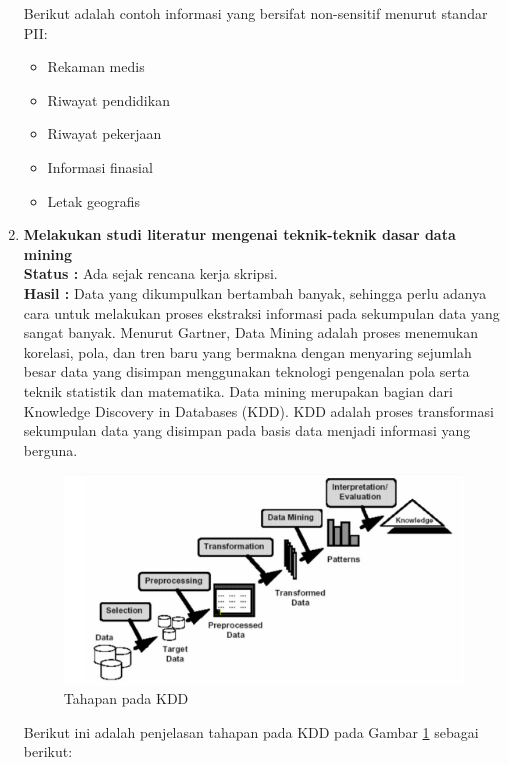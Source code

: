 \documentclass[a4paper,twoside]{article}
\begin{document}
\begin{enumerate}
\noindent Berikut adalah contoh informasi yang bersifat non-sensitif menurut standar PII:
\begin{itemize}
\item Rekaman medis
\item Riwayat pendidikan
\item Riwayat pekerjaan 
\item Informasi finasial
\item Letak geografis
\end{itemize}

		\item \textbf{Melakukan studi literatur mengenai teknik-teknik dasar data mining}\\
		{\bf Status :} Ada sejak rencana kerja skripsi.\\
		{\bf Hasil :} Data yang dikumpulkan bertambah banyak, sehingga perlu adanya cara untuk melakukan proses ekstraksi informasi pada sekumpulan data yang sangat banyak. Menurut Gartner, Data Mining adalah proses menemukan korelasi, pola, dan tren baru yang bermakna dengan menyaring sejumlah besar data yang disimpan menggunakan teknologi pengenalan pola serta teknik statistik dan matematika. Data mining merupakan bagian dari Knowledge Discovery in Databases (KDD). KDD adalah proses transformasi sekumpulan data yang disimpan pada basis data menjadi informasi yang berguna.\\

\begin{figure}[H]
	\centering
	\includegraphics[scale=0.4]{datamining1}
	\caption{Tahapan pada KDD}
	\label{fig:datamining1}
\end{figure}

\newpage
\noindent Berikut ini adalah penjelasan tahapan pada KDD pada Gambar \ref{fig:datamining1} sebagai berikut:


\end{enumerate}
\end{document}
